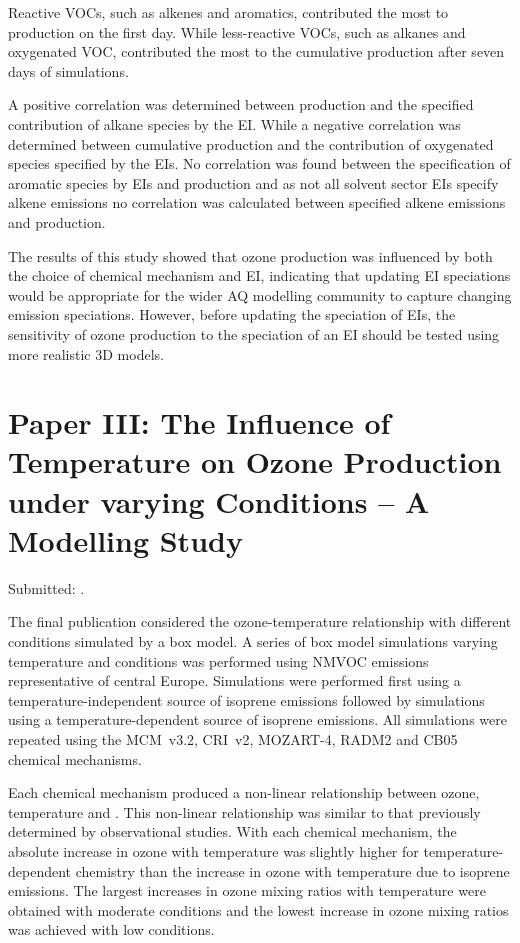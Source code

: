Reactive VOCs, such as alkenes and aromatics, contributed the most to  production on the first day.
While less-reactive VOCs, such as alkanes and oxygenated VOC, contributed the most to the cumulative  production after seven days of simulations. 

A positive correlation was determined between  production and the specified contribution of alkane species by the EI.
While a negative correlation was determined between cumulative  production and the contribution of oxygenated species specified by the EIs.
No correlation was found between the specification of aromatic species by EIs and  production and as not all solvent sector EIs specify alkene emissions no correlation was calculated between specified alkene emissions and  production.

The results of this study showed that ozone production was influenced by both the choice of chemical mechanism and EI, indicating that updating EI speciations would be appropriate for the wider AQ modelling community to capture changing emission speciations.
However, before updating the speciation of EIs, the sensitivity of ozone production to the speciation of an EI should be tested using more realistic 3D models.

\vspace{-2mm}
\singlespacing
\section{Paper III: The Influence of Temperature on Ozone Production under varying  Conditions -- A Modelling Study} \label{s:T-O3_results}
\onehalfspacing

\vspace{-2mm}
\noindent
Submitted: .
\vspace{3mm}

The final publication considered the ozone-temperature relationship with different  conditions simulated by a box model.
A series of box model simulations varying temperature and  conditions was performed using NMVOC emissions representative of central Europe. 
Simulations were performed first using a temperature-independent source of isoprene emissions followed by simulations using a temperature-dependent source of isoprene emissions.
All simulations were repeated using the MCM~v3.2, CRI~v2, MOZART-4, RADM2 and CB05 chemical mechanisms.

Each chemical mechanism produced a non-linear relationship between ozone, temperature and .
This non-linear relationship was similar to that previously determined by observational studies.  
With each chemical mechanism, the absolute increase in ozone with temperature was slightly higher for temperature-dependent chemistry than the increase in ozone with temperature due to isoprene emissions.
The largest increases in ozone mixing ratios with temperature were obtained with moderate  conditions and the lowest increase in ozone mixing ratios was achieved with low  conditions.

